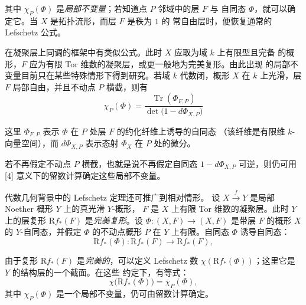\clearpage
{}
其中 $\chi_P(\Phi)$ 是\emph{局部不变量}；若知道点 $P$ 邻域中的层 $F$ 与
自同态 $\Phi$，就可以确定它。当 $X$ 是拓扑流形，而层 $F$ 是秩为 $1$ 的
常自由层时，便恢复通常的 Lefschetz 公式。

在凝聚层上同调的框架中有类似公式。此时 $X$ 应取为域 $k$ 上有限型且完备
的概形，$F$ 应为有限 Tor 维数的凝聚层，或更一般地为完美复形。由此出现
的局部不变量目前只在某些特殊情形下得到研究。若域 $k$ 代数闭，概形 $X$
在 $k$ 上光滑，层 $F$ 局部自由，并且不动点 $P$ 横截，则有
\[
\chi_P(\Phi)
=\frac{\operatorname{Tr}(\Phi_{F,P})}
       {\det\bigl(1-d\Phi_{X,P}\bigr)}
\]

这里 $\Phi_{F,P}$ 表示 $\Phi$ 在 $P$ 处层 $F$ 的约化纤维上诱导的自同态
（该纤维是有限维 $k$-向量空间），而 $d\Phi_{X,P}$ 表示态射 $\Phi_X$
在 $P$ 处的微分。

若不再假定不动点 $P$ 横截，也就是说不再假定自同态
$1-d\Phi_{X,P}$ 可逆，则仍可用 [4] 意义下的留数计算确定这些局部不变量。

代数几何背景中的 Lefschetz 定理还可推广到相对情形。
设 $X\xrightarrow{f}Y$ 是局部 Noether 概形 $Y$ 上的真光滑 $Y$-概形，
$F$ 是 $X$ 上有限 Tor 维数的凝聚层。此时 $Y$ 上的层复形
$\mathrm{R}f_*(F)$ 是\emph{完美复形}。设
$\Phi\colon(X,F)\longrightarrow(X,F)$ 是带层 $F$ 的概形 $X$ 的
$Y$-自同态，并假定 $\Phi$ 的不动点概形 $P$ 在 $Y$ 上有限。自同态
$\Phi$ 诱导自同态：
\[
\mathrm{R}f_*(\Phi)\colon
\mathrm{R}f_*(F)\longrightarrow\mathrm{R}f_*(F),
\]

由于复形 $\mathrm{R}f_*(F)$ 是\emph{完美的}，可以定义 Lefschetz 数
$\chi(\mathrm{R}f_*(\Phi))$；这里它是 $Y$ 的结构层的一个截面。在这些
约定下，有等式：
\[
\chi\bigl(\mathrm{R}f_*(\Phi)\bigr)=\chi_P(\Phi),
\]
其中 $\chi_P(\Phi)$ 是一个局部不变量，仍可由留数计算确定。
